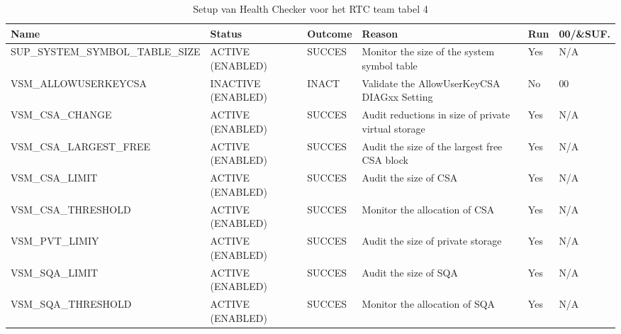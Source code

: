 \begin{landscape}
	\begin{table}[h]
		\begin{tabular}{|l|p{2.3cm}|l|p{4.5cm}|l|l|}
			\hline
			\textbf{Name}                       & \textbf{Status}   & \textbf{Outcome} & \textbf{Reason}    & \textbf{Run} &	\textbf{00/\&SUF.} \\ \hline
			SUP\_SYSTEM\_SYMBOL\_TABLE\_SIZE & ACTIVE (ENABLED)   & SUCCES & Monitor   the size of the system symbol table         & Yes & N/A \\ \hline
			VSM\_ALLOWUSERKEYCSA             & INACTIVE (ENABLED) & INACT  & Validate   the AllowUserKeyCSA DIAGxx Setting         & No  & 00  \\ \hline
			VSM\_CSA\_CHANGE                 & ACTIVE (ENABLED)   & SUCCES & Audit   reductions in size of private virtual storage & Yes & N/A \\ \hline
			VSM\_CSA\_LARGEST\_FREE          & ACTIVE (ENABLED)   & SUCCES & Audit   the size of the largest free CSA block        & Yes & N/A \\ \hline
			VSM\_CSA\_LIMIT                  & ACTIVE (ENABLED)   & SUCCES & Audit   the size of CSA                               & Yes & N/A \\ \hline
			VSM\_CSA\_THRESHOLD              & ACTIVE (ENABLED)   & SUCCES & Monitor   the allocation of CSA                       & Yes & N/A \\ \hline
			VSM\_PVT\_LIMIY                  & ACTIVE (ENABLED)   & SUCCES & Audit   the size of private storage                   & Yes & N/A \\ \hline
			VSM\_SQA\_LIMIT                  & ACTIVE (ENABLED)   & SUCCES & Audit   the size of SQA                               & Yes & N/A \\ \hline
			VSM\_SQA\_THRESHOLD              & ACTIVE (ENABLED)   & SUCCES & Monitor   the allocation of SQA                       & Yes & N/A \\ \hline
		\end{tabular}
		\caption[Health Checker RTC team tabel 4]{Setup van Health Checker voor het RTC team tabel 4}
		\label{tbl:RTC Team Tabel 4}
	\end{table}
\end{landscape}

